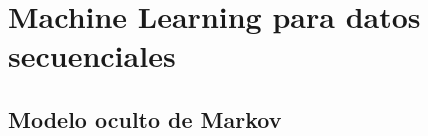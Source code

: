 

\section{Machine Learning para datos secuenciales}\label{ch2:sec-machinelearning-seq-data}
 




\subsection{Modelo oculto de Markov}
 
